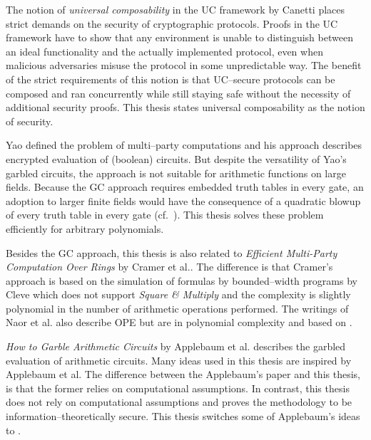 %
%
\label{sec:related-work}

The notion of \emph{universal composability} in the UC framework by Canetti
\cite{canetti05} places strict demands on the security of cryptographic
protocols. Proofs in the UC framework have to show that any environment is
unable to distinguish between an ideal functionality and the actually
implemented protocol, even when malicious adversaries misuse the protocol in
some unpredictable way. The benefit of the strict requirements of this notion is
that UC--secure protocols can be composed and ran concurrently while still
staying safe without the necessity of additional security proofs. This thesis
states universal composability as the notion of security.

Yao defined the problem of multi--party computations and his  approach \cite{yao86} describes encrypted evaluation of (boolean)
circuits. But despite the versatility of Yao's garbled circuits, the approach is
not suitable for arithmetic functions on large fields. Because the GC approach
requires embedded truth tables in every gate, an adoption to larger finite
fields would have the consequence of a quadratic blowup of every truth table in
every gate (cf.\ \cite{naor99privacy}). This thesis solves these problem
efficiently for arbitrary polynomials.

Besides the GC approach, this thesis is also related to \emph{Efficient
Multi-Party Computation Over Rings} by Cramer et al.\cite{cramer03}. The
difference is that Cramer's approach is based on the simulation of formulas by
bounded--width programs by Cleve \cite{cleve91} which does not support
\emph{Square \& Multiply} \cite{knuth81} and the complexity is slightly
polynomial in the number of arithmetic operations performed. The writings of
Naor et al.\cite{naor99,naor06} also describe OPE but are in polynomial
complexity and based on  \cite{rabin81}.

\emph{How to Garble Arithmetic Circuits} by Applebaum et al.\cite{gac2012}
describes the garbled evaluation of arithmetic circuits.  Many ideas used in
this thesis are inspired by Applebaum et al. The difference between the
Applebaum's paper and this thesis, is that the former relies on computational
assumptions. In contrast, this thesis does not rely on computational assumptions
and proves the methodology to be information--theoretically secure. This thesis
switches some of Applebaum's ideas to  \cite{davidgoliath}.

